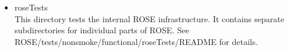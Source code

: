 \begin{itemize}
   \item roseTests \\
   This directory tests the internal ROSE infrastructure. It contains separate
subdirectories for individual parts of ROSE. See ROSE/tests/nonsmoke/functional/roseTests/README
for details.

\end{itemize}

